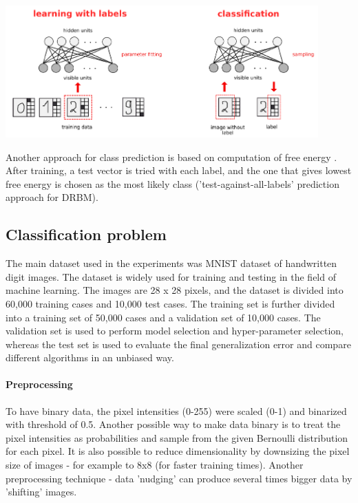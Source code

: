 \documentclass[a4paper]{scrartcl}
\begin{document}
\begin{center}
\includegraphics[width=12cm]{images/DRBM.png}
\end{center}
Another approach for class prediction is based on computation of free energy \cite{Hinton}. After training, a test vector is tried with each label, and the one that gives lowest free energy is chosen as the most likely class ('test-against-all-labels' prediction approach for DRBM).

\subsection{Classification problem}
\par The main dataset used in the experiments was MNIST dataset of handwritten digit images. The dataset is widely used for training and testing in the field of machine learning. The images are 28 x 28 pixels, and the dataset is divided into 60,000 training cases and 10,000 test cases. The training set is further divided into a training set of 50,000 cases and a validation set of 10,000 cases. The validation set is used to perform model selection and hyper-parameter selection, whereas the test set is used to evaluate the final generalization error and compare different algorithms in an unbiased way.
\paragraph{Preprocessing} To have binary data, the pixel intensities (0-255) were scaled (0-1) and binarized with threshold of 0.5. Another possible way to make data binary is to treat the pixel intensities as probabilities and sample from the given Bernoulli distribution for each pixel. It is also possible to reduce dimensionality by downsizing the pixel size of images - for example to 8x8 (for faster training times). Another preprocessing technique - data 'nudging' can produce several times bigger data by 'shifting' images.
 
\end{document}
